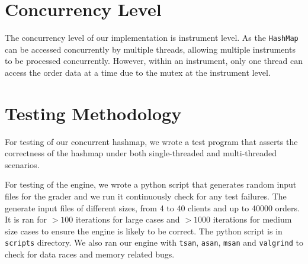 \documentclass[11pt]{article}
\begin{document}


\section{Concurrency Level}\label{sec:Concurrency Level} %

The concurrency level of our implementation is instrument level. As the \verb|HashMap| can be
accessed concurrently by multiple threads, allowing multiple instruments to be processed
concurrently. However, within an instrument, only one thread can access the order data at a time
due to the mutex at the instrument level.


\section{Testing Methodology}\label{sec:Testing Methodology} %

For testing of our concurrent hashmap, we wrote a test program that asserts the correctness of the
hashmap under both single-threaded and multi-threaded scenarios.

For testing of the engine, we wrote a python script that generates random input files for the grader and we run it
continuously check for any test failures. The generate input files of different sizes, from 4 to 40
clients and up to 40000 orders. It is ran for $> 100$ iterations for large cases and $> 1000$
iterations for medium size cases to ensure the engine is likely to be correct.
The python script is in \texttt{scripts} directory. We
also ran our engine with \texttt{tsan}, \texttt{asan}, \texttt{msan} and \texttt{valgrind} to check
for data races and memory related bugs.

\end{document}
